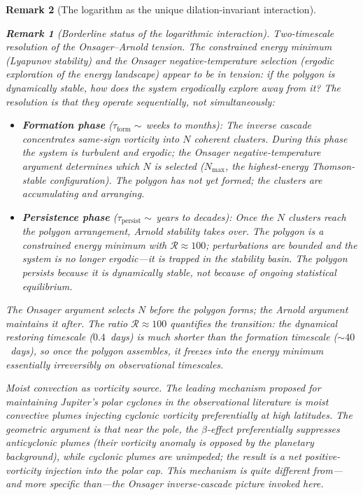 \documentclass[12pt, a4paper]{article}
\newtheorem{remark}{Remark}[section]
\numberwithin{equation}{section}
\begin{document}
\begin{remark}[The logarithm as the unique dilation-invariant interaction]
\begin{remark}[Borderline status of the logarithmic interaction]
\emph{Two-timescale resolution of the Onsager--Arnold tension.}
The constrained energy minimum (Lyapunov stability) and the Onsager
negative-temperature selection (ergodic exploration of the energy
landscape) appear to be in tension: if the polygon is dynamically
stable, how does the system ergodically explore away from it?
The resolution is that they operate \emph{sequentially}, not
simultaneously:
\begin{itemize}
  \item \textbf{Formation phase}
    ($\tau_{\mathrm{form}} \sim$\,weeks to months):
    The inverse cascade concentrates same-sign vorticity into $N$
    coherent clusters.  During this phase the system is turbulent
    and ergodic; the Onsager negative-temperature argument determines
    \emph{which} $N$ is selected ($N_{\max}$, the highest-energy
    Thomson-stable configuration).  The polygon has not yet formed;
    the clusters are accumulating and arranging.
  \item \textbf{Persistence phase}
    ($\tau_{\mathrm{persist}} \sim$\,years to decades):
    Once the $N$ clusters reach the polygon arrangement, Arnold
    stability takes over.  The polygon is a constrained energy
    minimum with $\mathcal{R} \approx 100$; perturbations are
    bounded and the system is \emph{no longer ergodic}---it is
    trapped in the stability basin.  The polygon persists because
    it is dynamically stable, not because of ongoing statistical
    equilibrium.
\end{itemize}
The Onsager argument selects $N$ \emph{before} the polygon forms;
the Arnold argument maintains it \emph{after}.  The ratio
$\mathcal{R} \approx 100$ quantifies the transition: the dynamical
restoring timescale ($0.4$~days) is much shorter than the formation
timescale ($\sim\!40$~days), so once the polygon assembles, it
freezes into the energy minimum essentially irreversibly on
observational timescales.

\emph{Moist convection as vorticity source.}
The leading mechanism proposed for maintaining Jupiter's polar cyclones
in the observational literature \citep{ONeill2015} is moist convective
plumes injecting cyclonic vorticity preferentially at high latitudes.
The geometric argument is that near the pole, the $\beta$-effect
preferentially suppresses anticyclonic plumes (their vorticity anomaly
is opposed by the planetary background), while cyclonic plumes are
unimpeded; the result is a net positive-vorticity injection into the
polar cap.  This mechanism is quite different from---and more specific
than---the Onsager inverse-cascade picture invoked here.


\end{remark}
\end{remark}
\end{document}
